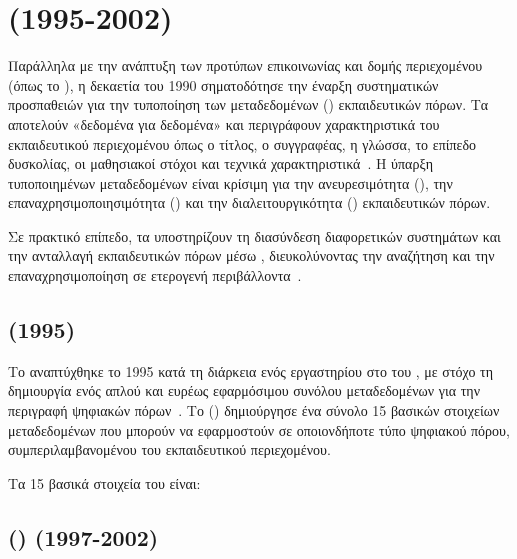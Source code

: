 \section{   (1995-2002)}
\label{sec:metadata_foundation}

Παράλληλα με την ανάπτυξη των προτύπων επικοινωνίας και δομής περιεχομένου (όπως το ), η δεκαετία του 1990 σηματοδότησε την έναρξη συστηματικών προσπαθειών για την τυποποίηση των μεταδεδομένων (\textit{}) εκπαιδευτικών πόρων. Τα  αποτελούν «δεδομένα για δεδομένα» και περιγράφουν χαρακτηριστικά του εκπαιδευτικού περιεχομένου όπως ο τίτλος, ο συγγραφέας, η γλώσσα, το επίπεδο δυσκολίας, οι μαθησιακοί στόχοι και τεχνικά χαρακτηριστικά~\cite{dcmi2020dcmi_terms,ieee2002lom_standard,dublincore2024metadata}. Η ύπαρξη τυποποιημένων μεταδεδομένων είναι κρίσιμη για την ανευρεσιμότητα (\textit{}), την επαναχρησιμοποιησιμότητα (\textit{}) και την διαλειτουργικότητα (\textit{}) εκπαιδευτικών πόρων.

Σε πρακτικό επίπεδο, τα  υποστηρίζουν τη διασύνδεση διαφορετικών συστημάτων και την ανταλλαγή εκπαιδευτικών πόρων μέσω , διευκολύνοντας την αναζήτηση και την επαναχρησιμοποίηση σε ετερογενή περιβάλλοντα~\cite{inokufu2024metadata,researchgate2025metadata}.

\subsection{    (1995)}
\label{subsec:dublin_core}

Το      αναπτύχθηκε το 1995 κατά τη διάρκεια ενός εργαστηρίου στο  του , με στόχο τη δημιουργία ενός απλού και ευρέως εφαρμόσιμου συνόλου μεταδεδομένων για την περιγραφή ψηφιακών πόρων~\cite{dcmi2020dcmi_terms,dcpapers2024educational}. Το     () δημιούργησε ένα σύνολο 15 βασικών στοιχείων μεταδεδομένων που μπορούν να εφαρμοστούν σε οποιονδήποτε τύπο ψηφιακού πόρου, συμπεριλαμβανομένου του εκπαιδευτικού περιεχομένου.

Τα 15 βασικά στοιχεία του   είναι:



\subsection{    () (1997-2002)}
\label{subsec:ieee_lom}

